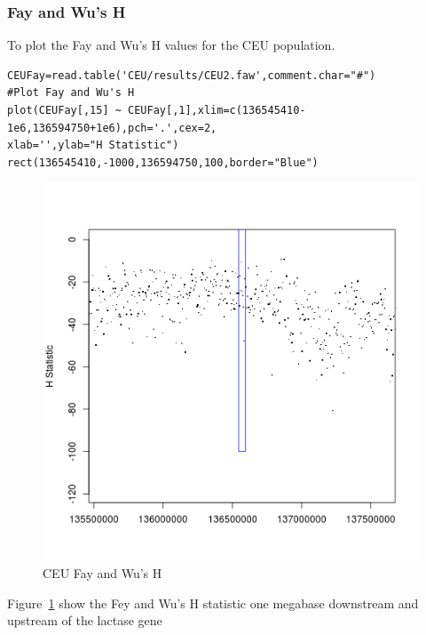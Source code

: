 \subsubsection{Fay and Wu's H}
To plot the Fay and Wu's H values for the CEU population.\\
\begin{verbatim}
CEUFay=read.table('CEU/results/CEU2.faw',comment.char="#")
#Plot Fay and Wu's H
plot(CEUFay[,15] ~ CEUFay[,1],xlim=c(136545410-1e6,136594750+1e6),pch='.',cex=2,
xlab='',ylab="H Statistic")
rect(136545410,-1000,136594750,100,border="Blue") 
\end{verbatim}
\begin{figure}
\centering
\includegraphics{pictures/CEUFay.png}
\caption{CEU Fay and Wu's H}
\label{fig:fayceu}
\end{figure}
Figure~\ref{fig:fayceu} show the Fey and Wu's H statistic one megabase downstream and upstream of the lactase gene

